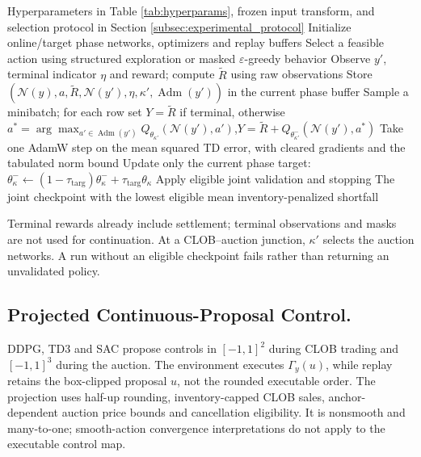 \documentclass[11pt]{article}
\begin{document}
\begin{algorithm}[ht!]


\caption{Phase-coupled masked Double DQN}
\label{alg:dqn}
\begin{algorithmic}[1]
\REQUIRE Hyperparameters in Table \ref{tab:hyperparams}, frozen input transform, and selection protocol in Section \ref{subsec:experimental_protocol}
\STATE Initialize online/target phase networks, optimizers and replay buffers
    \STATE Select a feasible action using structured exploration or masked $\varepsilon$-greedy behavior
    \STATE Observe $y'$, terminal indicator $\eta$ and reward; compute $\tilde R$ using raw observations
    \STATE Store $(\mathcal N(y),a,\tilde R,\mathcal N(y'),\eta,\kappa',\operatorname{Adm}(y'))$ in the current phase buffer
      \STATE Sample a minibatch; for each row set $Y=\tilde R$ if terminal, otherwise
      \STATE \hspace{1em}$a^*=\arg\max_{a'\in\operatorname{Adm}(y')}Q_{\theta_{\kappa'}}(\mathcal N(y'),a')$,\quad $Y=\tilde R+Q_{\theta_{\kappa'}^-}(\mathcal N(y'),a^*)$
      \STATE Take one AdamW step on the mean squared TD error, with cleared gradients and the tabulated norm bound
      \STATE Update only the current phase target: $\theta_\kappa^-\gets(1-\tau_{\mathrm{targ}})\theta_\kappa^-+\tau_{\mathrm{targ}}\theta_\kappa$
    \ENDIF
  \ENDFOR
  \STATE Apply eligible joint validation and stopping
\ENDFOR
\RETURN The joint checkpoint with the lowest eligible mean inventory-penalized shortfall
\end{algorithmic}
\end{algorithm}

Terminal rewards already include settlement; terminal observations and masks are not used for continuation. At a CLOB--auction junction, $\kappa'$ selects the auction networks. A run without an eligible checkpoint fails rather than returning an unvalidated policy.

\subsection{Projected Continuous-Proposal Control.}
DDPG, TD3 and SAC \cite{lillicrap2020continuous,fujimoto2018addressing,haarnoja2018soft,achiam2018spinningup} propose controls in $[-1,1]^2$ during CLOB trading and $[-1,1]^3$ during the auction. The environment executes $\Gamma_y(u)$, while replay retains the box-clipped proposal $u$, not the rounded executable order. The projection uses half-up rounding, inventory-capped CLOB sales, anchor-dependent auction price bounds and cancellation eligibility. It is nonsmooth and many-to-one; smooth-action convergence interpretations do not apply to the executable control map.
\end{document}
